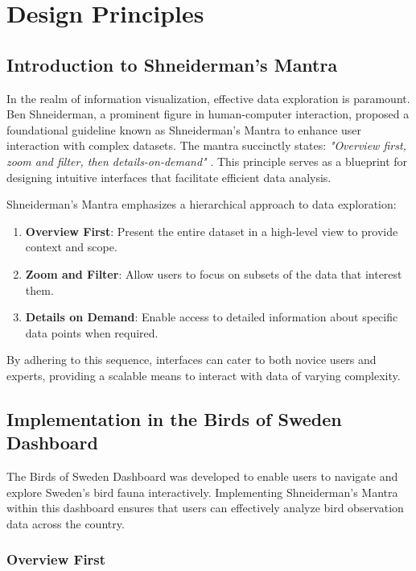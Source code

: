 \chapter{Design Principles}

\section{Introduction to Shneiderman's Mantra}

In the realm of information visualization, effective data exploration is paramount. Ben Shneiderman, a prominent figure in human-computer interaction, proposed a foundational guideline known as Shneiderman's Mantra to enhance user interaction with complex datasets. The mantra succinctly states: \textit{"Overview first, zoom and filter, then details-on-demand"} \cite{hampdatavisualizationSchneidermansMantra2016}. This principle serves as a blueprint for designing intuitive interfaces that facilitate efficient data analysis.

Shneiderman's Mantra emphasizes a hierarchical approach to data exploration:

\begin{enumerate} \item \textbf{Overview First}: Present the entire dataset in a high-level view to provide context and scope. \item \textbf{Zoom and Filter}: Allow users to focus on subsets of the data that interest them. \item \textbf{Details on Demand}: Enable access to detailed information about specific data points when required. \end{enumerate}

By adhering to this sequence, interfaces can cater to both novice users and experts, providing a scalable means to interact with data of varying complexity.

\section{Implementation in the Birds of Sweden Dashboard}

The Birds of Sweden Dashboard was developed to enable users to navigate and explore Sweden's bird fauna interactively. Implementing Shneiderman's Mantra within this dashboard ensures that users can effectively analyze bird observation data across the country.

\subsection{Overview First}

